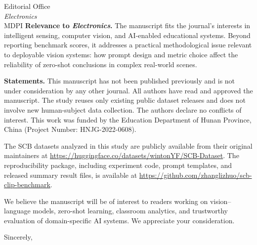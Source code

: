 \documentclass[11pt]{letter}
\begin{document}
\begin{letter}{Editorial Office \\ \textit{Electronics} \\ MDPI}
\textbf{Relevance to \textit{Electronics}.}
The manuscript fits the journal's interests in intelligent sensing, computer vision, and AI-enabled educational systems. Beyond reporting benchmark scores, it addresses a practical methodological issue relevant to deployable vision systems: how prompt design and metric choice affect the reliability of zero-shot conclusions in complex real-world scenes.

\textbf{Statements.}
This manuscript has not been published previously and is not under consideration by any other journal. All authors have read and approved the manuscript. The study reuses only existing public dataset releases and does not involve new human-subject data collection. The authors declare no conflicts of interest. This work was funded by the Education Department of Hunan Province, China (Project Number: HNJG-2022-0608).

The SCB datasets analyzed in this study are publicly available from their original maintainers at \url{https://huggingface.co/datasets/wintonYF/SCB-Dataset}. The reproducibility package, including experiment code, prompt templates, and released summary result files, is available at \url{https://github.com/zhanglizhuo/scb-clip-benchmark}.

We believe the manuscript will be of interest to readers working on vision--language models, zero-shot learning, classroom analytics, and trustworthy evaluation of domain-specific AI systems. We appreciate your consideration.

\closing{Sincerely,}

\end{letter}
\end{document}
